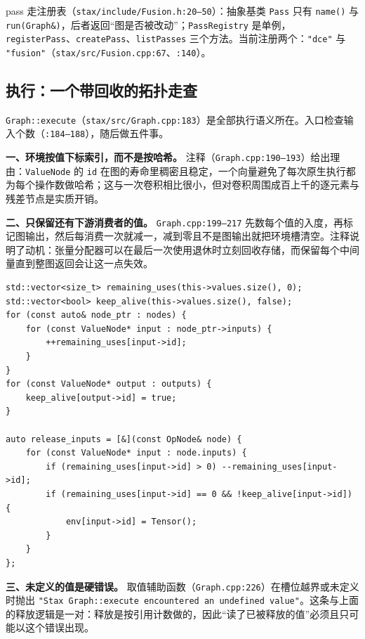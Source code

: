 pass 走注册表（\texttt{stax/include/Fusion.h:20--50}）：抽象基类 \texttt{Pass} 只有 \texttt{name()} 与 \texttt{run(Graph\&)}，后者返回“图是否被改动”；\texttt{PassRegistry} 是单例，\texttt{registerPass}、\texttt{createPass}、\texttt{listPasses} 三个方法。当前注册两个：\texttt{"dce"} 与 \texttt{"fusion"}（\texttt{stax/src/Fusion.cpp:67}、\texttt{:140}）。

\subsection{执行：一个带回收的拓扑走查}

\texttt{Graph::execute}（\texttt{stax/src/Graph.cpp:183}）是全部执行语义所在。入口检查输入个数（\texttt{:184--188}），随后做五件事。

\textbf{一、环境按值下标索引，而不是按哈希。} 注释（\texttt{Graph.cpp:190--193}）给出理由：\texttt{ValueNode} 的 \texttt{id} 在图的寿命里稠密且稳定，一个向量避免了每次原生执行都为每个操作数做哈希；这与一次卷积相比很小，但对卷积周围成百上千的逐元素与残差节点是实质开销。

\textbf{二、只保留还有下游消费者的值。} \texttt{Graph.cpp:199--217} 先数每个值的入度，再标记图输出，然后每消费一次就减一，减到零且不是图输出就把环境槽清空。注释说明了动机：张量分配器可以在最后一次使用退休时立刻回收存储，而保留每个中间量直到整图返回会让这一点失效。

\begin{lstlisting}[caption={最后一次使用即释放（\texttt{stax/src/Graph.cpp:199--217}）。}, label=lst:ng:release, style=cppstyle]
std::vector<size_t> remaining_uses(this->values.size(), 0);
std::vector<bool> keep_alive(this->values.size(), false);
for (const auto& node_ptr : nodes) {
    for (const ValueNode* input : node_ptr->inputs) {
        ++remaining_uses[input->id];
    }
}
for (const ValueNode* output : outputs) {
    keep_alive[output->id] = true;
}

auto release_inputs = [&](const OpNode& node) {
    for (const ValueNode* input : node.inputs) {
        if (remaining_uses[input->id] > 0) --remaining_uses[input->id];
        if (remaining_uses[input->id] == 0 && !keep_alive[input->id]) {
            env[input->id] = Tensor();
        }
    }
};
\end{lstlisting}

\textbf{三、未定义的值是硬错误。} 取值辅助函数（\texttt{Graph.cpp:226}）在槽位越界或未定义时抛出 \texttt{"Stax Graph::execute encountered an undefined value"}。这条与上面的释放逻辑是一对：释放是按引用计数做的，因此“读了已被释放的值”必须且只可能以这个错误出现。

